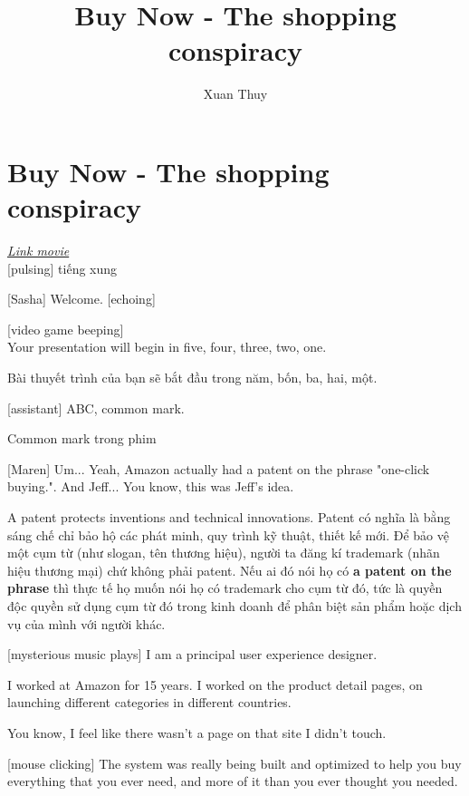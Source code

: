 \documentclass[a4paper]{article}
\title{Buy Now - The shopping conspiracy}
\author{Xuan Thuy}
\begin{document}
	\section*{Buy Now - The shopping conspiracy}
	
	\textit{\href{https://www.netflix.com/vn-en/title/81554996}{Link movie}}\\
	
	[pulsing] tiếng xung
	
	[Sasha] Welcome. [echoing]
	
	[video game beeping]\\
	
	Your presentation will begin in five, four, three, two, one.
	
	\begin{vietnamese-v2}
		Bài thuyết trình của bạn sẽ bắt đầu trong năm, bốn, ba, hai, một.	
	\end{vietnamese-v2}

	[assistant] ABC, common mark.
	
	\begin{vietnamese-v2}
		Common mark trong phim
	\end{vietnamese-v2}
	
	[Maren] Um... Yeah, Amazon actually had a patent on the phrase "one-click buying.". And Jeff... You know, this was Jeff's idea.
	
	\begin{vietnamese-v2}
		A patent protects inventions and technical innovations. Patent có nghĩa là bằng sáng chế chỉ bảo hộ các phát minh, quy trình kỹ thuật, thiết kế mới.
		Để bảo vệ một cụm từ (như slogan, tên thương hiệu), người ta đăng kí trademark (nhãn hiệu thương mại) chứ không phải patent.
		Nếu ai đó nói họ có \textbf{a patent on the phrase} thì thực tế họ muốn nói họ có trademark cho cụm từ đó, tức là quyền độc quyền sử dụng cụm từ đó trong kinh doanh để phân biệt sản phẩm hoặc dịch vụ của mình với người khác.
	\end{vietnamese-v2}
	
	[mysterious music plays]
	I am a principal user experience designer.
	
	I worked at Amazon for 15 years.
	I worked on the product detail pages, on launching different categories in different countries.
	
	You know, I feel like there wasn't a page on that site I didn't touch.
	
	[mouse clicking]
	The system was really being built and optimized to help you buy everything that you ever need, and more of it than you ever thought you needed.
	
\end{document}
